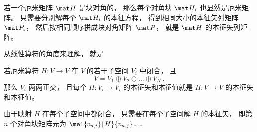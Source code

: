 

\begin{theorem}{}
若一个厄米矩阵 $\mat H$ 是块对角的， 那么每个对角块 $\mat H_i$ 也显然是厄米矩阵。 只需要分别解每个 $\mat H_i$ 的本征方程， 得到相同大小的本征矢列矩阵 $\mat P_i$， 然后按相同顺序拼成块对角矩阵 $\mat P$， 就是 $\mat H$ 的本征矢列矩阵。
\end{theorem}

从线性算符的角度来理解， 就是
\begin{theorem}{}
若厄米算符 $H:V\to V$ 在 $V$ 的若干子空间 $V_i$ 中闭合， 且
\begin{equation}
V = V_1\oplus V_2\oplus \dots \oplus V_N~.
\end{equation}
那么 $V_i$ 两两正交， 且每个 $H:V_i\to V_i$ 的本征矢和本征值就是 $H:V\to V$ 的本征矢和本征值。
\end{theorem}


由于映射 $H$ 在每个子空间中都闭合， 只需要在每个子空间解 $H$ 的本征矢， 即第 $n$ 个对角块矩阵元为 $\mel{v_{n,i}}{H}{v_{n,j}}$……
